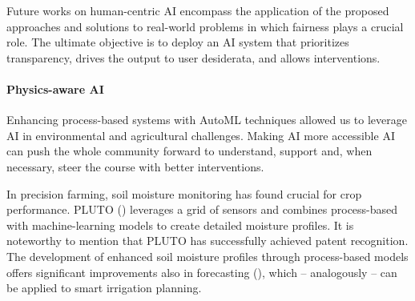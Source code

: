 Future works on human-centric AI encompass the application of the proposed approaches and solutions to real-world problems in which fairness plays a crucial role.
The ultimate objective is to deploy an AI system that prioritizes transparency, drives the output to user desiderata, and allows interventions.

\paragraph{Physics-aware AI}
Enhancing process-based systems with AutoML techniques allowed us to leverage AI in environmental and agricultural challenges.
Making AI more accessible AI can push the whole community forward to understand, support and, when necessary, steer the course with better interventions.

In precision farming, soil moisture monitoring has found crucial for crop performance.
PLUTO () leverages a grid of sensors and combines process-based with machine-learning models to create detailed moisture profiles.
It is noteworthy to mention that PLUTO has successfully achieved patent recognition.
The development of enhanced soil moisture profiles through process-based models offers significant improvements also in forecasting (), which -- analogously -- can be applied to smart irrigation planning.

